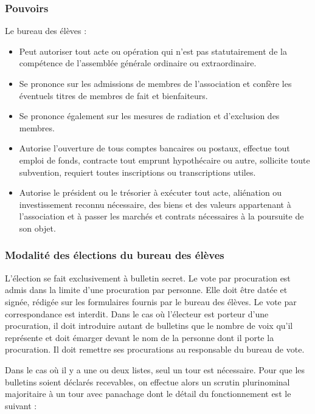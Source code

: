 \documentclass{article}
\begin{document}
			\subsubsection{Pouvoirs}
				Le bureau des élèves :
				\begin{itemize}
					\item Peut autoriser tout acte ou opération qui n’est pas
					    statutairement de la compétence de l’assemblée générale
					    ordinaire ou extraordinaire.
					\item Se prononce sur les admissions de membres de
						l’association et confère les éventuels titres de membres
						de fait et bienfaiteurs.
					\item Se prononce également sur les mesures de radiation et
	    				d’exclusion des membres.
					\item Autorise l’ouverture de tous comptes bancaires ou
						postaux, effectue tout emploi de fonds, contracte tout
						emprunt hypothécaire ou autre, sollicite toute
						subvention, requiert toutes inscriptions ou
						transcriptions utiles.
					\item Autorise le président ou le trésorier à exécuter tout
						acte, aliénation ou investissement reconnu nécessaire,
						des biens et des valeurs appartenant à l’association et
						à passer les marchés et contrats nécessaires à la
						poursuite de son objet.
				\end{itemize}

			\subsubsection{Modalité des élections du bureau des élèves}
			\label{sssec:elections}
				L’élection se fait exclusivement à bulletin secret. Le vote par
				procuration est admis dans la limite d’une procuration par
				personne. Elle doit être datée et signée, rédigée sur les
				formulaires fournis par le bureau des élèves. Le vote par
				correspondance est interdit. Dans le cas où l’électeur est
				porteur d’une procuration, il doit introduire autant de
				bulletins que le nombre de voix qu’il représente et doit émarger
				devant le nom de la personne dont il porte la procuration. Il
				doit remettre ses procurations au responsable du bureau de vote.
				
				Dans le cas où il y a une ou deux listes, seul un tour est
				nécessaire. Pour que les bulletins soient déclarés recevables,
				on effectue alors un scrutin plurinominal majoritaire à un tour
				avec panachage dont le détail du fonctionnement est le suivant :
\end{document}
